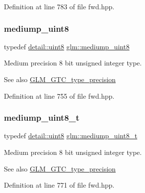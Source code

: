 Definition at line 783 of file fwd.\+hpp.

\mbox{\label{group__gtc__type__precision_gac4b849eaac0543a10f97f4bdda4850a8}} 
\subsubsection{\texorpdfstring{mediump\_uint8}{mediump\_uint8}}
{\footnotesize\ttfamily typedef \mbox{\hyperlink{namespaceglm_1_1detail_aef2588f97d090cc19fbbe0c74fe17c8f}{detail\+::uint8}} \mbox{\hyperlink{group__gtc__type__precision_gac4b849eaac0543a10f97f4bdda4850a8}{glm\+::mediump\+\_\+uint8}}}

Medium precision 8 bit unsigned integer type. \begin{DoxySeeAlso}{See also}
\mbox{\hyperlink{group__gtc__type__precision}{G\+L\+M\+\_\+\+G\+T\+C\+\_\+type\+\_\+precision}} 
\end{DoxySeeAlso}


Definition at line 755 of file fwd.\+hpp.

\mbox{\label{group__gtc__type__precision_gadfa38f3c245d371c4b2079f1fd68928b}} 
\subsubsection{\texorpdfstring{mediump\_uint8\_t}{mediump\_uint8\_t}}
{\footnotesize\ttfamily typedef \mbox{\hyperlink{namespaceglm_1_1detail_aef2588f97d090cc19fbbe0c74fe17c8f}{detail\+::uint8}} \mbox{\hyperlink{group__gtc__type__precision_gadfa38f3c245d371c4b2079f1fd68928b}{glm\+::mediump\+\_\+uint8\+\_\+t}}}

Medium precision 8 bit unsigned integer type. \begin{DoxySeeAlso}{See also}
\mbox{\hyperlink{group__gtc__type__precision}{G\+L\+M\+\_\+\+G\+T\+C\+\_\+type\+\_\+precision}} 
\end{DoxySeeAlso}


Definition at line 771 of file fwd.\+hpp.

\mbox{\label{group__gtc__type__precision_gae7a1571503f83d2264ddfa705a6b082a}} 
